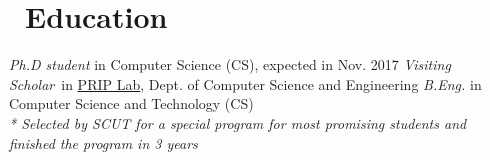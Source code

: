 \documentclass{resume}
\begin{document}



\section{\faGraduationCap\ Education}
\textit{Ph.D student} in Computer Science (CS), expected in Nov. 2017
\textit{Visiting Scholar}\ in \href{http://biometrics.cse.msu.edu/}{PRIP Lab}{, Dept. of Computer Science and Engineering}
\textit{B.Eng.} in Computer Science and Technology (CS)\\
\textit{* Selected by SCUT for a special program for most promising students and finished the program in 3 years}
\end{document}
